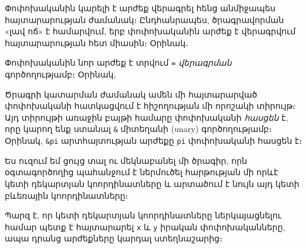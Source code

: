 Փոփոխականին կարելի է արժեք վերագրել հենց անմիջապես հայտարարության
ժամանակ։ Ընդհանրապես, ծրագրավորման «լավ ոճ» է համարվում, երբ փոփոխականին
արժեք է վերագրվում հայտարարության հետ միասին։ Օրինակ․

\begin{Shaded}
\begin{Highlighting}[]
\NormalTok{;       }
\NormalTok{;  }
\NormalTok{;        }
\end{Highlighting}
\end{Shaded}

Փոփոխականին նոր արժեք է տրվում \texttt{=} \emph{վերագրման}
գործողությամբ։ Օրինակ,

\begin{Shaded}
\begin{Highlighting}[]
\NormalTok{;          }
\NormalTok{;           }
\end{Highlighting}
\end{Shaded}

Ծրագրի կատարման ժամանակ ամեն մի հայտարարված փոփոխականի հատկացվում է
հիշողության մի որոշակի տիրույթ։ Այդ տիրույթի առաջին բայթի համարը
փոփոխականի \emph{հասցեն} է, որը կարող ենք ստանալ \texttt{\&} միտեղանի
(unary) գործողությամբ։ Օրինակ, \texttt{\&pi} արտհայտության արժեքը
\texttt{pi} փոփոխականի հասցեն է։

Ես ուզում եմ ցույց տալ ու մեկնաբանել մի ծրագիր, որն օգտագործողից
պահանջում է ներմուծել հարթության մի որևէ կետի դեկարտյան կոորդինատները և
արտածում է նույն այդ կետի բևեռային կոորդինատները։

Պարզ է, որ կետի դեկարտյան կոորդինատները ներկայացնելու համար պետք է
հայտարարել \texttt{x} և \texttt{y} իրական փոփոխականները, ապա դրանց
արժեքները կարդալ ստեղնաշարից։

\begin{Shaded}
\begin{Highlighting}[]
\NormalTok{;}
\end{Highlighting}
\end{Shaded}

